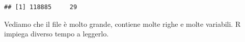 \documentclass[]{book}
\newenvironment{Shaded}{\begin{snugshade}}{\end{snugshade}}
\newcommand{\DataTypeTok}[1]{\textcolor[rgb]{0.13,0.29,0.53}{#1}}
\newcommand{\KeywordTok}[1]{\textcolor[rgb]{0.13,0.29,0.53}{\textbf{#1}}}
\newcommand{\NormalTok}[1]{#1}
\newcommand{\OperatorTok}[1]{\textcolor[rgb]{0.81,0.36,0.00}{\textbf{#1}}}
\newcommand{\OtherTok}[1]{\textcolor[rgb]{0.56,0.35,0.01}{#1}}
\newcommand{\StringTok}[1]{\textcolor[rgb]{0.31,0.60,0.02}{#1}}
\begin{document}
\begin{verbatim}
## [1] 118885     29
\end{verbatim}

Vediamo che il file è molto grande, contiene molte righe e molte variabili. R impiega diverso tempo a leggerlo.

\begin{Shaded}
\end{Shaded}
\end{document}
